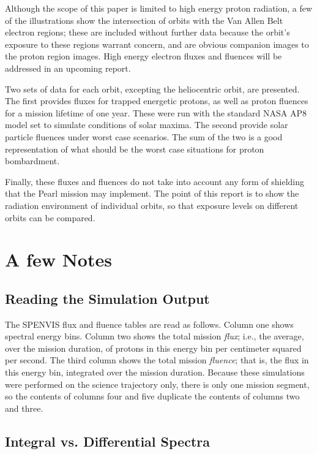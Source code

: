 \documentclass[11pt]{article}
\begin{document}
Although the scope of this paper is limited to high energy proton radiation, a few of the illustrations show the intersection of orbits with the Van Allen Belt electron regions; these are included without further data because the orbit's exposure to these regions warrant concern, and are obvious companion images to the proton region images. High energy electron fluxes and fluences will be addressed in an upcoming report.

Two sets of data for each orbit, excepting the heliocentric orbit, are presented. The first provides fluxes for trapped energetic protons, as well as proton fluences for a mission lifetime of one year. These were run with the standard NASA AP8 model set to simulate conditions of solar maxima. The second provide solar particle fluences under worst case scenarios. The sum of the two is a good representation of what should be the worst case situations for proton bombardment.

Finally, these fluxes and fluences do not take into account any form of shielding that the Pearl mission may implement. The point of this report is to show the radiation environment of individual orbits, so that exposure levels on different orbits can be compared.

\section{A few Notes}

\subsection{Reading the Simulation Output}

The SPENVIS flux and fluence tables are read as follows. Column one shows spectral energy bins. Column two shows the total mission \textit{flux}; i.e., the average, over the mission duration, of protons in this energy bin per centimeter squared per second. The third column shows the total mission \textit{fluence}; that is, the flux in this energy bin, integrated over the mission duration. Because these simulations were performed on the science trajectory only, there is only one mission segment, so the contents of columns four and five duplicate the contents of columns two and three. 

\subsection{Integral vs. Differential Spectra}
\end{document}

